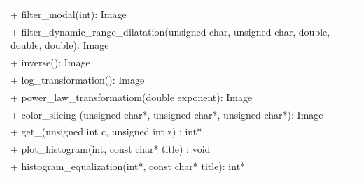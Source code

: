 \documentclass[a4paper]{article}
\begin{document}
\begin{table}[H]
\begin{tabular}[15cm]{ 
    >{\arraybackslash}m{15cm}}
        + filter\_modal(int): Image \\
        + filter\_dynamic\_range\_dilatation(unsigned char, unsigned char, double, double, double): Image \\
        + inverse(): Image \\
        + log\_transformation(): Image \\
        + power\_law\_transformatiom(double exponent): Image \\
        + color\_slicing (unsigned char*, unsigned char*, unsigned char*): Image \\
        + get\_(unsigned int c, unsigned int z) : int*\\
        + plot\_histogram(int, const char* title) : void \\
        + histogram\_equalization(int*, const char* title): int* \\
        
        \bottomrule
        
 
	\end{tabular}
    
\end{table}
\end{document}
